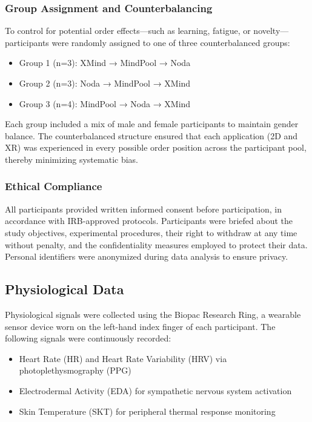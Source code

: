 \documentclass{CPP}
\begin{document}
\subsubsection{Group Assignment and Counterbalancing}

To control for potential order effects—such as learning, fatigue, or novelty—participants were randomly assigned to one of three counterbalanced groups:

\begin{itemize}
    \item Group 1 (n=3): XMind → MindPool → Noda
    \item Group 2 (n=3): Noda → MindPool → XMind
    \item Group 3 (n=4): MindPool → Noda → XMind
\end{itemize}

Each group included a mix of male and female participants to maintain gender balance. The counterbalanced structure ensured that each application (2D and XR) was experienced in every possible order position across the participant pool, thereby minimizing systematic bias.

\subsubsection{Ethical Compliance}

All participants provided written informed consent before participation, in accordance with IRB-approved protocols. Participants were briefed about the study objectives, experimental procedures, their right to withdraw at any time without penalty, and the confidentiality measures employed to protect their data. Personal identifiers were anonymized during data analysis to ensure privacy.

\subsection{Physiological Data}

Physiological signals were collected using the Biopac Research Ring, a wearable sensor device worn on the left-hand index finger of each participant. The following signals were continuously recorded:

\begin{itemize}
    \item Heart Rate (HR) and Heart Rate Variability (HRV) via photoplethysmography (PPG)
    \item Electrodermal Activity (EDA) for sympathetic nervous system activation
    \item Skin Temperature (SKT) for peripheral thermal response monitoring
\end{itemize}
\end{document}
